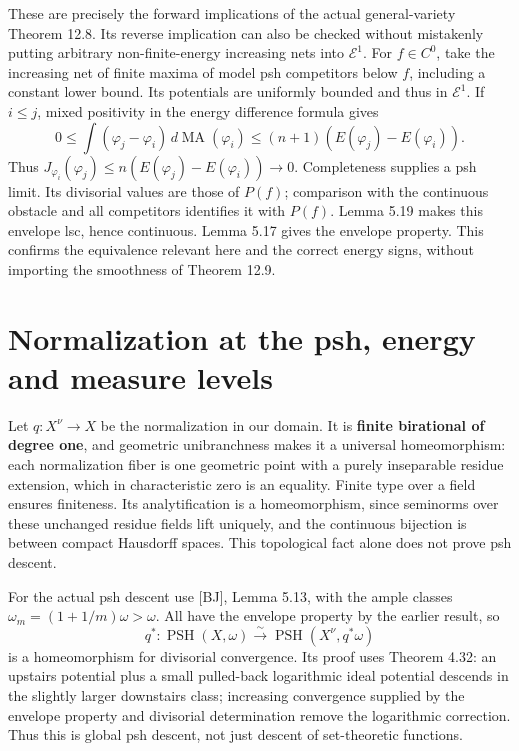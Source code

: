 \documentclass[11pt]{article}
\begin{document}
These are precisely the forward implications of the actual
general-variety Theorem 12.8. Its reverse implication can also be
checked without mistakenly putting arbitrary non-finite-energy
increasing nets into \(\mathcal E^1\). For \(f\in C^0\), take the
increasing net of finite maxima of model psh competitors below \(f\),
including a constant lower bound. Its potentials are uniformly bounded
and thus in \(\mathcal E^1\). If \(i\leq j\), mixed positivity in the
energy difference formula gives
\[0\leq\int(\varphi_j-\varphi_i)\,d\operatorname{MA}(\varphi_i)
\leq(n+1)(E(\varphi_j)-E(\varphi_i)).\] Thus
\(J_{\varphi_i}(\varphi_j)\leq n(E(\varphi_j)-E(\varphi_i))\to0\).
Completeness supplies a psh limit. Its divisorial values are those of
\(P(f)\); comparison with the continuous obstacle and all competitors
identifies it with \(P(f)\). Lemma 5.19 makes this envelope lsc, hence
continuous. Lemma 5.17 gives the envelope property. This confirms the
equivalence relevant here and the correct energy signs, without
importing the smoothness of Theorem 12.9.

\section{Normalization at the psh, energy and measure
levels}\label{normalization-at-the-psh-energy-and-measure-levels}

Let \(q:X^\nu\to X\) be the normalization in our domain. It is
\textbf{finite birational of degree one}, and geometric unibranchness
makes it a universal homeomorphism: each normalization fiber is one
geometric point with a purely inseparable residue extension, which in
characteristic zero is an equality. Finite type over a field ensures
finiteness. Its analytification is a homeomorphism, since seminorms over
these unchanged residue fields lift uniquely, and the continuous
bijection is between compact Hausdorff spaces. This topological fact
alone does not prove psh descent.

For the actual psh descent use {[}BJ{]}, Lemma 5.13, with the ample
classes \(\omega_m=(1+1/m)\omega>\omega\). All have the envelope
property by the earlier result, so
\[q^*:\operatorname{PSH}(X,\omega)\xrightarrow{\sim}\operatorname{PSH}(X^\nu,q^*\omega)\]
is a homeomorphism for divisorial convergence. Its proof uses Theorem
4.32: an upstairs potential plus a small pulled-back logarithmic ideal
potential descends in the slightly larger downstairs class; increasing
convergence supplied by the envelope property and divisorial
determination remove the logarithmic correction. Thus this is global psh
descent, not just descent of set-theoretic functions.
\end{document}
